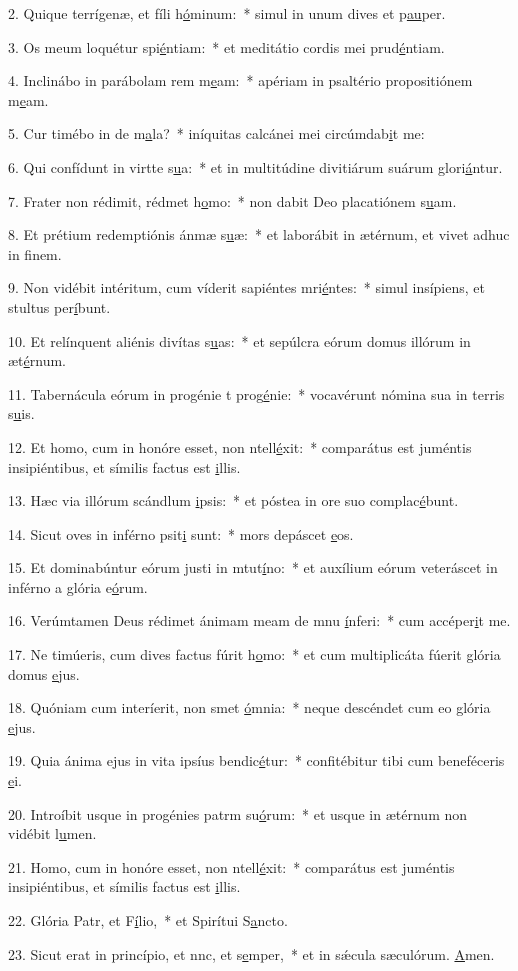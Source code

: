 2. Quique terrígenæ, et fíli h\uline{ó}minum:~* simul in unum dives et p\uline{au}per.\par 
3. Os meum loquétur spi\uline{é}ntiam:~* et meditátio cordis mei prud\uline{é}ntiam.\par 
4. Inclinábo in parábolam rem m\uline{e}am:~* apériam in psaltério propositiónem m\uline{e}am.\par 
5. Cur timébo in de m\uline{a}la?~* iníquitas calcánei mei circúmdab\uline{i}t me:\par 
6. Qui confídunt in virtte s\uline{u}a:~* et in multitúdine divitiárum suárum glori\uline{á}ntur.\par 
7. Frater non rédimit, rédmet h\uline{o}mo:~* non dabit Deo placatiónem s\uline{u}am.\par 
8. Et prétium redemptiónis ánmæ s\uline{u}æ:~* et laborábit in ætérnum, et vivet adhuc in f\uline{i}nem.\par 
9. Non vidébit intéritum, cum víderit sapiéntes mri\uline{é}ntes:~* simul insípiens, et stultus per\uline{í}bunt.\par 
10. Et relínquent aliénis divítas s\uline{u}as:~* et sepúlcra eórum domus illórum in æt\uline{é}rnum.\par 
11. Tabernácula eórum in progénie t prog\uline{é}nie:~* vocavérunt nómina sua in terris s\uline{u}is.\par 
12. Et homo, cum in honóre esset, non ntell\uline{é}xit:~* comparátus est juméntis insipiéntibus, et símilis factus est \uline{i}llis.\par 
13. Hæc via illórum scándlum \uline{i}psis:~* et póstea in ore suo complac\uline{é}bunt.\par 
14. Sicut oves in inférno psit\uline{i} sunt:~* mors depáscet \uline{e}os.\par 
15. Et dominabúntur eórum justi in mtut\uline{í}no:~* et auxílium eórum veteráscet in inférno a glória e\uline{ó}rum.\par 
16. Verúmtamen Deus rédimet ánimam meam de mnu \uline{í}nferi:~* cum accéper\uline{i}t me.\par 
17. Ne timúeris, cum dives factus fúrit h\uline{o}mo:~* et cum multiplicáta fúerit glória domus \uline{e}jus.\par 
18. Quóniam cum interíerit, non smet \uline{ó}mnia:~* neque descéndet cum eo glória \uline{e}jus.\par 
19. Quia ánima ejus in vita ipsíus bendic\uline{é}tur:~* confitébitur tibi cum beneféceris \uline{e}i.\par 
20. Introíbit usque in progénies patrm su\uline{ó}rum:~* et usque in ætérnum non vidébit l\uline{u}men.\par 
21. Homo, cum in honóre esset, non ntell\uline{é}xit:~* comparátus est juméntis insipiéntibus, et símilis factus est \uline{i}llis.\par 
22. Glória Patr, et F\uline{í}lio,~* et Spirítui S\uline{a}ncto.\par 
23. Sicut erat in princípio, et nnc, et s\uline{e}mper,~* et in sǽcula sæculórum. \uline{A}men.\par 
